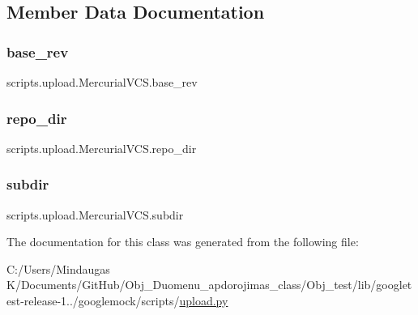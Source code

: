 \subsection{Member Data Documentation}
\mbox{\label{classscripts_1_1upload_1_1_mercurial_v_c_s_a7dcbcd0b325eb905734bcff1865237d5}} 
\subsubsection{\texorpdfstring{base\_rev}{base\_rev}}
{\footnotesize\ttfamily scripts.\+upload.\+Mercurial\+V\+C\+S.\+base\+\_\+rev}

\mbox{\label{classscripts_1_1upload_1_1_mercurial_v_c_s_a39626d66e75c5e010e7d3add346896e0}} 
\subsubsection{\texorpdfstring{repo\_dir}{repo\_dir}}
{\footnotesize\ttfamily scripts.\+upload.\+Mercurial\+V\+C\+S.\+repo\+\_\+dir}

\mbox{\label{classscripts_1_1upload_1_1_mercurial_v_c_s_ad6247a65a744bb8538975a94005039d8}} 
\subsubsection{\texorpdfstring{subdir}{subdir}}
{\footnotesize\ttfamily scripts.\+upload.\+Mercurial\+V\+C\+S.\+subdir}



The documentation for this class was generated from the following file\+:\begin{DoxyCompactItemize}
\item 
C\+:/\+Users/\+Mindaugas K/\+Documents/\+Git\+Hub/\+Obj\+\_\+\+Duomenu\+\_\+apdorojimas\+\_\+class/\+Obj\+\_\+test/lib/googletest-\/release-\/1../googlemock/scripts/\mbox{\hyperlink{_obj__test_2lib_2googletest-release-1_88_81_2googlemock_2scripts_2upload_8py}{upload.\+py}}\end{DoxyCompactItemize}
